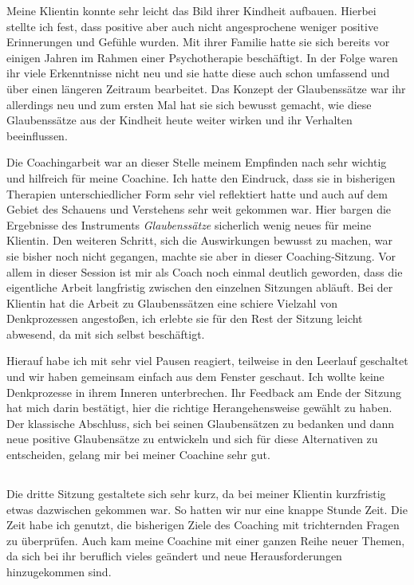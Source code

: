 \documentclass[11pt,a4paper]{article}
\begin{document}
Meine Klientin konnte sehr leicht das Bild ihrer Kindheit aufbauen. Hierbei stellte ich fest, dass positive aber auch nicht angesprochene weniger positive Erinnerungen und Gefühle wurden. Mit ihrer Familie hatte sie sich bereits vor einigen Jahren im Rahmen einer Psychotherapie beschäftigt. In der Folge waren ihr viele Erkenntnisse nicht neu und sie hatte diese auch schon umfassend und über einen längeren Zeitraum bearbeitet. Das Konzept der Glaubenssätze war ihr allerdings neu und zum ersten Mal hat sie sich bewusst gemacht, wie diese Glaubenssätze aus der Kindheit heute weiter wirken und ihr Verhalten beeinflussen.

Die Coachingarbeit war an dieser Stelle meinem Empfinden nach sehr wichtig und hilfreich für meine Coachine. Ich hatte den Eindruck, dass sie in bisherigen Therapien unterschiedlicher Form sehr viel reflektiert hatte und auch auf dem Gebiet des Schauens und Verstehens sehr weit gekommen war. Hier bargen die Ergebnisse des Instruments \textsl{Glaubenssätze} sicherlich wenig neues für meine Klientin. Den weiteren Schritt, sich die Auswirkungen bewusst zu machen, war sie bisher noch nicht gegangen, machte sie aber in dieser Coaching-Sitzung. Vor allem in dieser Session ist mir als Coach noch einmal deutlich geworden, dass die eigentliche Arbeit langfristig zwischen den einzelnen Sitzungen abläuft. Bei der Klientin hat die Arbeit zu Glaubenssätzen eine schiere Vielzahl von Denkprozessen angestoßen, ich erlebte sie für den Rest der Sitzung leicht abwesend, da mit sich selbst beschäftigt. 

Hierauf habe ich mit sehr viel Pausen reagiert, teilweise in den Leerlauf geschaltet und wir haben gemeinsam einfach aus dem Fenster geschaut. Ich wollte keine Denkprozesse in ihrem Inneren unterbrechen. Ihr Feedback am Ende der Sitzung hat mich darin bestätigt, hier die richtige Herangehensweise gewählt zu haben. Der klassische Abschluss, sich bei seinen Glaubensätzen zu bedanken und dann neue positive Glaubensätze zu entwickeln und sich für diese Alternativen zu entscheiden, gelang mir bei meiner Coachine sehr gut. 



\subsection*{\color{Orange}{Dritte Sitzung: Trichtern mit Fragen für die Überprüfung der Ziele}}


Die dritte Sitzung gestaltete sich sehr kurz, da bei meiner Klientin kurzfristig etwas dazwischen gekommen war. So hatten wir nur eine knappe Stunde Zeit. Die Zeit habe ich genutzt, die bisherigen Ziele des Coaching mit trichternden Fragen zu überprüfen. Auch kam meine Coachine mit einer ganzen Reihe neuer Themen, da sich bei ihr beruflich vieles geändert und neue Herausforderungen hinzugekommen sind.
\end{document}
